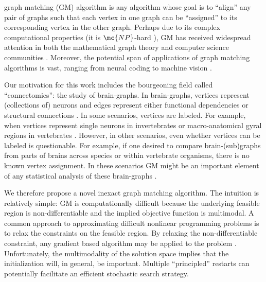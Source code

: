 \documentclass[10pt,journal,cspaper,compsoc]{IEEEtran}
\begin{document}

 graph matching (GM) algorithm is any algorithm whose goal is to ``align'' any pair of graphs such that each vertex in one graph can be ``assigned'' to its corresponding vertex in the other graph.  Perhaps due to its complex computational properties (it is $\mc{NP}$-hard \cite{Garey1979}), GM has received widespread attention in both the mathematical graph theory and computer science communities \cite{Conte2004}.  Moreover, the potential span of applications of graph matching algorithms is vast, ranging from neural coding \cite{Richiardi2010} to machine vision \cite{Wiskott1997}.  

Our motivation for this work includes the bourgeoning field called ``connectomics'': the study of brain-graphs.  In brain-graphs,  vertices represent (collections of) neurons and edges represent either functional dependencies or structural connections \cite{Sporns2010}.  In some scenarios, vertices are labeled.  For example, when vertices represent single neurons in invertebrates \cite{WhiteBrenner86} or macro-anatomical gyral regions in vertebrates \cite{Biswal2010,Bullmore2010}.  However, in other scenarios, even whether vertices can be labeled is questionable.  For example, if one desired to compare brain-(sub)graphs from parts of brains across species or within vertebrate organisms, there is no known vertex assignment.  In these scenarios GM might be an important element of any statistical analysis of these brain-graphs \cite{VP11_sigsub, VP11_unlabeled}.


We therefore propose a novel inexact graph matching algorithm.  The intuition is relatively simple: GM is computationally difficult because the underlying feasible region is non-differentiable and the implied objective function is multimodal.  A common approach to approximating difficult nonlinear programming problems is to relax the constraints on the feasible region.  By relaxing the non-differentiable constraint, any gradient based algorithm may be applied to the problem \cite{Mangasarian1987}. Unfortunately, the multimodality of the solution space implies that the initialization will, in general, be important.  Multiple ``principled'' restarts can potentially facilitate an efficient stochastic search strategy.  
\end{document}
